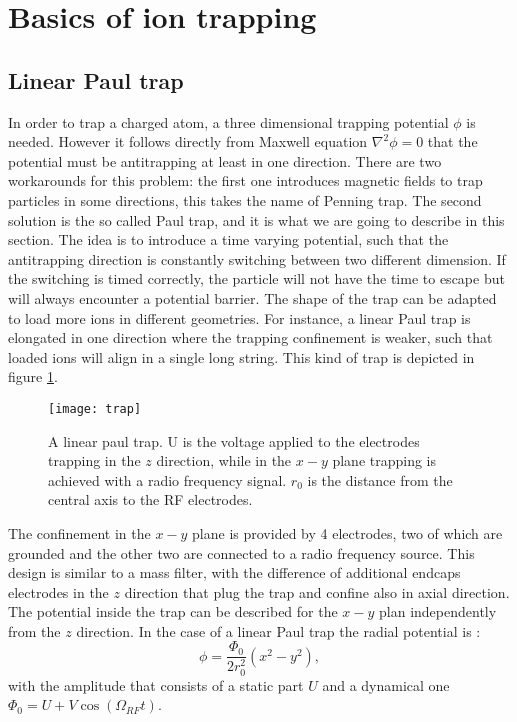 \section{Basics of ion trapping}
\subsection{Linear Paul trap}
In order to trap a charged atom, a three dimensional trapping potential $\phi$ is needed. However it follows directly from Maxwell equation $\nabla^2 \phi = 0$ that the potential must be antitrapping at least in one direction. There are two workarounds for this problem: the first one introduces magnetic fields to trap particles in some directions, this takes the name of Penning trap. The second solution is the so called Paul trap, and it is what we are going to describe in this section. The idea is to introduce a time varying potential, such that the antitrapping direction is constantly switching between two  different dimension. If the switching is timed correctly, the particle will not have the time to escape but will always encounter a potential barrier.
The shape of the trap can be adapted to load more ions in different geometries. For instance, a linear Paul trap is elongated in one direction where the trapping confinement is weaker, such that loaded ions will align in a single long string. This kind of trap is depicted in figure \ref{trap}.
\begin{figure}[H]
\centering
\texttt{[image: trap]}
\caption{A linear paul trap. U is the voltage applied to the electrodes trapping in the $z$ direction, while in the $x-y$ plane trapping is achieved with a radio frequency signal. $r_0$ is the distance from the central axis to the RF electrodes.}
\label{trap}
\end{figure}
The confinement in the $x-y$ plane is provided by 4 electrodes, two of which are grounded and the other two are connected to a radio frequency source. This design is similar to a mass filter, with the difference of additional endcaps electrodes in the $z$ direction that plug the trap and confine also in axial direction.\\
The potential inside the trap can be described for the $x-y$ plan independently from the $z$ direction. In the case of a linear Paul trap the radial potential is \cite{traptheory}:
\begin{equation}
\phi  = \frac{\Phi_0}{2r_0^2}\left(x^2 - y^2\right),
\end{equation}
with the amplitude that consists of a static part $U$ and a dynamical one $\Phi_0 = U + V \cos(\Omega_{RF} t)$.
